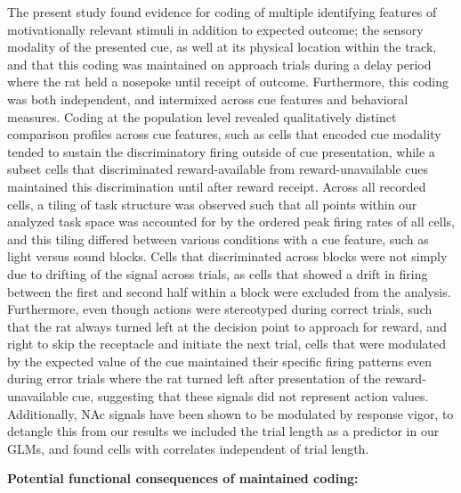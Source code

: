 \documentclass[11pt]{article}
\begin{document}
{The present study found evidence for coding of multiple identifying features of
motivationally relevant stimuli in addition to expected outcome; the sensory
modality of the presented cue, as well at its physical location within the
track, and that this coding was maintained on approach trials during a delay
period where the rat held a nosepoke until receipt of outcome. Furthermore, this
coding was both independent, and intermixed across cue features and behavioral
measures. Coding at the population level revealed qualitatively distinct
comparison profiles across cue features, such as cells that encoded cue modality
tended to sustain the discriminatory firing outside of cue presentation, while a
subset cells that discriminated reward-available from reward-unavailable cues
maintained this discrimination until after reward receipt. Across all recorded
cells, a tiling of task structure was observed such that all points within our
analyzed task space was accounted for by the ordered peak firing rates of all
cells, and this tiling differed between various conditions with a cue feature,
such as light versus sound blocks. Cells that discriminated across blocks were
not simply due to drifting of the signal across trials, as cells that showed a
drift in firing between the first and second half within a block were excluded
from the analysis. Furthermore, even though actions were stereotyped during
correct trials, such that the rat always turned left at the decision point to
approach for reward, and right to skip the receptacle and initiate the next
trial, cells that were modulated by the expected value of the cue maintained
their specific firing patterns even during error trials where the rat turned
left after presentation of the reward-unavailable cue, suggesting that these
signals did not represent action values. Additionally, NAc signals have been
shown to be modulated by response vigor, to detangle this from our results we
included the trial length as a predictor in our GLMs, and found cells with
correlates independent of trial length.

{\bf Potential functional consequences of maintained coding:}

}
\end{document}
